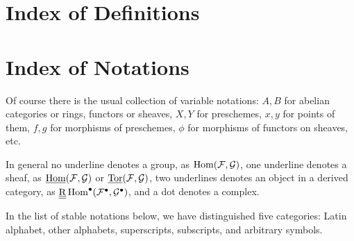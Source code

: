 \backmatter
{}
\chapter{Index of Definitions}

\chapter{Index of Notations}
Of course there is the usual collection of variable notations: $A, B$ for abelian categories or rings, functors or sheaves, $X,Y$ for preschemes, $x,y$ for points of them, $f,g$ for morphisms of preschemes, $\phi$ for morphisms of functors on sheaves, etc.


In general no underline denotes a group, as $\operatorname{Hom}(\mathcal{F}, \mathcal{G})$, one underline denotes a sheaf, as $\underline{\operatorname{Hom}}(\mathcal{F}, \mathcal{G})$ or $\underline{\operatorname{Tor}}(\mathcal{F}, \mathcal{G})$, two underlines denotes an object in a derived category, as $\underline{\underline{\operatorname{R}}}\operatorname{Hom}^\bullet(\mathcal{F}^\bullet, \mathcal{G}^\bullet)$, and a dot denotes a complex.

In the list of stable notations below, we have distinguished five categories: Latin alphabet, other alphabets, superscripts, subscripts, and arbitrary symbols.

